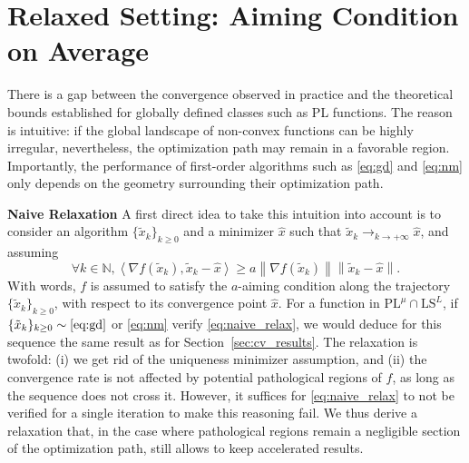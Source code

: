 \documentclass{article}
\newcommand{\jh}[1]{{\color{red} #1}}
\def\N{{\mathbb{N}}}
\def\xdisc{\{\tilde x_k \}_{k\ge 0}}
\def\pl{{\text{PL}^\mu}}
\newcommand{\norm}[1]{\left\lVert#1\right\rVert}
\newcommand{\dotprod}[1]{\left< #1\right>}
\newcommand{\sqc}{\text{SQC}_{\tau}^{\mu}}
\newcommand{\ls}{\text{LS}^{L}}
\newcommand{\ac}{\text{AC}^{a}}
\theoremstyle{plain}
\theoremstyle{definition}
\theoremstyle{remark}
\begin{document}



\section{Relaxed Setting: Aiming Condition on Average}\label{sec:avg}
There is a gap between the convergence observed in practice and the theoretical bounds established for globally defined classes such as PL functions. 
The reason is intuitive: if the global landscape of non-convex functions can be highly irregular, nevertheless, the optimization path may remain in a favorable region. Importantly, the performance of first-order algorithms such as \eqref{eq:gd} and \eqref{eq:nm} only depends on the geometry surrounding their optimization path.

\noindent
\textbf{Naive Relaxation \: }A first direct idea to take this intuition into account is to consider an algorithm $\xdisc$ and a minimizer $\hat x$ such that $\tilde x_k \to_{k \to +\infty} \hat x$, and assuming
\begin{equation}\label{eq:naive_relax}
  \forall k\in \N,\dotprod{\nabla f(\tilde x_k),\tilde x_k-\hat x} \ge a \norm{\nabla f(\tilde x_k)}\norm{\tilde x_k-\hat x}.
\end{equation}
With words, $f$ is assumed to satisfy the $a$-aiming condition along the trajectory $\xdisc$, with respect to its convergence point $\hat x$. For a function in $\pl \cap \ls$, if $\xdisc \sim \eqref{eq:gd}$ or \eqref{eq:nm} verify \eqref{eq:naive_relax}, we would deduce for this sequence the same result as for Section~\ref{sec:cv_results}. 
The relaxation is twofold: (i) we get rid of the uniqueness minimizer assumption, and (ii) the convergence rate is not affected by potential pathological regions of $f$, as long as the sequence does not cross it. However, it suffices for \eqref{eq:naive_relax} to not be verified for a single iteration to make this reasoning fail. We thus derive a relaxation that, in the case where pathological regions remain a negligible section of the optimization path, still allows to keep accelerated results. 
\end{document}
